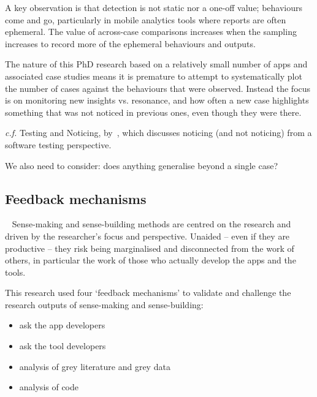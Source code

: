 A key observation is that detection is not static nor a one-off value; behaviours come and go, particularly in mobile analytics tools where reports are often ephemeral. The value of across-case comparisons increases when the sampling increases to record more of the ephemeral behaviours and outputs.

The nature of this PhD research based on a relatively small number of apps and associated case studies means it is premature to attempt to systematically plot the number of cases against the behaviours that were observed. Instead the focus is on monitoring 
new insights vs. resonance, and how often a new case highlights something that was not noticed in previous ones, even though they were there. %

\begin{kaobox}[frametitle=Parallels from Software Testing]
\textit{c.f.} Testing and Noticing, by~\textcite{bolton2009_testing_and_noticing}, which discusses noticing (and not noticing) from a software testing perspective.
\end{kaobox}

We also need to consider: does anything generalise beyond a single case?   

\subsection{Feedback mechanisms}~\label{methodology-feedback-mechanisms-topic}
Sense-making and sense-building methods are centred on the research and driven by the researcher's focus and perspective. Unaided -- even if they are productive -- they risk being marginalised and disconnected from the work of others, in particular the work of those who actually develop the apps and the tools. 

This research used four `feedback mechanisms' to validate and challenge the research outputs of sense-making and sense-building:

\begin{itemize}
\itemsep0em
\item ask the app developers
\item ask the tool developers
\item analysis of grey literature and grey data
\item analysis of code
\end{itemize}

